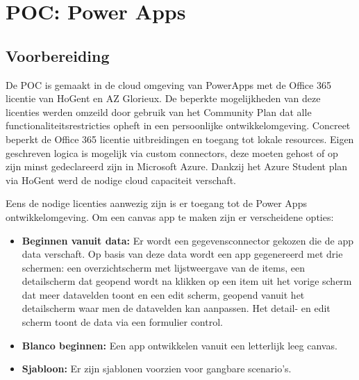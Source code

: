 
\chapter{POC: Power Apps}
\label{ch:powerapps-poc}



\section{Voorbereiding}
\label{sec:voorbereiding-pa}

De POC is gemaakt in de cloud omgeving van PowerApps met de Office 365 licentie van HoGent en AZ Glorieux. De beperkte mogelijkheden van deze licenties werden omzeild door gebruik van het Community Plan dat alle functionaliteitsrestricties opheft in een persoonlijke ontwikkelomgeving. Concreet beperkt de Office 365 licentie uitbreidingen en toegang tot lokale resources. Eigen geschreven logica is mogelijk via custom connectors, deze moeten gehost of op zijn minst gedeclareerd zijn in Microsoft Azure. Dankzij het Azure Student plan via HoGent werd de nodige cloud capaciteit verschaft.

Eens de nodige licenties aanwezig zijn is er toegang tot de Power Apps ontwikkelomgeving. Om een canvas app te maken zijn er verscheidene opties:
\begin{itemize}
    \item \textbf{Beginnen vanuit data:} Er wordt een gegevensconnector gekozen die de app data verschaft. Op basis van deze data wordt een app gegenereerd met drie schermen: een overzichtscherm met lijstweergave van de items, een detailscherm dat geopend wordt na klikken op een item uit het vorige scherm dat meer datavelden toont en een edit scherm, geopend vanuit het detailscherm waar men de datavelden kan aanpassen. Het detail- en edit scherm toont de data via een formulier control.
    \item \textbf{Blanco beginnen:} Een app ontwikkelen vanuit een letterlijk leeg canvas.
    \item \textbf{Sjabloon:} Er zijn sjablonen voorzien voor gangbare scenario's.
\end{itemize}

